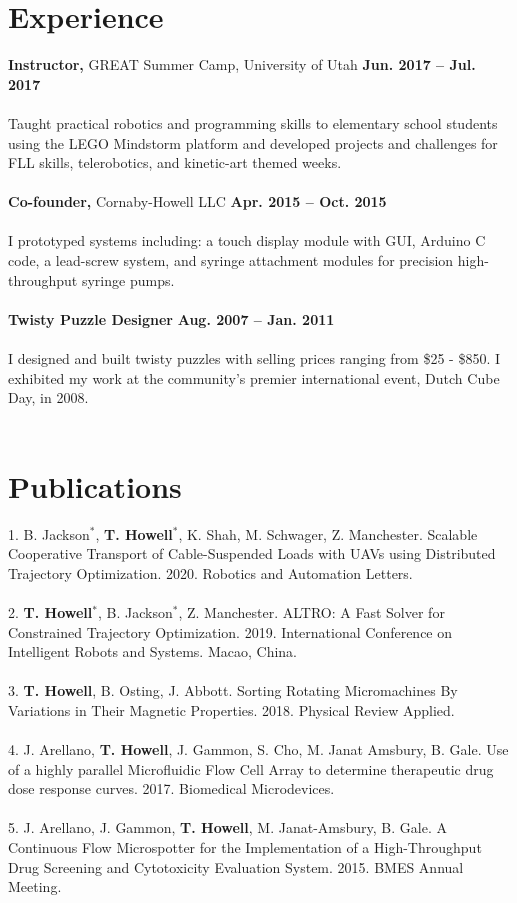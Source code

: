 \documentclass[margin,line]{res}
\begin{document}
\begin{resume}
\section{\sc Experience}
{\bf Instructor,} GREAT Summer Camp, University of Utah
\hfill {\bf Jun. 2017 – Jul. 2017}\\
\\
Taught practical robotics and programming skills to elementary school students using the LEGO Mindstorm platform and developed projects and challenges for FLL skills, telerobotics, and kinetic-art themed weeks.\\
\\
{\bf Co-founder,} Cornaby-Howell LLC
\hfill {\bf Apr. 2015 – Oct. 2015}\\
\\
I prototyped systems including: a touch display module with GUI, Arduino C code, a lead-screw system,
and syringe attachment modules for precision high-throughput syringe pumps.\\
\\
{\bf Twisty Puzzle Designer} 
\hfill {\bf Aug. 2007 – Jan. 2011}\\
\\
I designed and built twisty puzzles with selling prices ranging from \$25 - \$850. I exhibited my work at
the community’s premier international event, Dutch Cube Day, in 2008.\\
\\

\section{\sc Publications}
1. B. Jackson$^*$, \textbf{T. Howell}$^*$, K. Shah, M. Schwager, Z. Manchester. Scalable Cooperative Transport of Cable-Suspended Loads with UAVs using Distributed Trajectory Optimization. 2020. Robotics and Automation Letters.\\
\\
2. \textbf{T. Howell}$^*$, B. Jackson$^*$, Z. Manchester. ALTRO: A Fast Solver for Constrained Trajectory Optimization. 2019. International Conference on Intelligent Robots and Systems. Macao, China.\\
\\
3. \textbf{T. Howell}, B. Osting, J. Abbott. Sorting Rotating Micromachines By Variations in Their Magnetic
Properties. 2018. Physical Review Applied.\\
\\
4. J. Arellano, \textbf{T. Howell}, J. Gammon, S. Cho, M. Janat Amsbury, B. Gale. Use of a highly parallel
Microfluidic Flow Cell Array to determine therapeutic drug dose response curves. 2017. Biomedical
Microdevices.\\
\\
5. J. Arellano, J. Gammon, \textbf{T. Howell}, M. Janat-Amsbury, B. Gale. A Continuous Flow Microspotter for
the Implementation of a High-Throughput Drug Screening and Cytotoxicity Evaluation System.
2015. BMES Annual Meeting.
\\

\end{resume}
\end{document}

